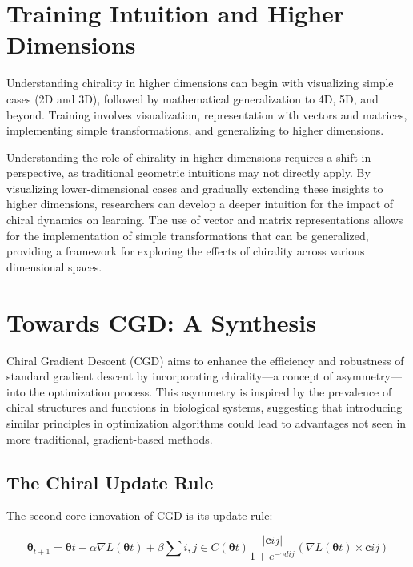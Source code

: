 \documentclass[12pt, a4paper]{article}
\begin{document}
\section{Training Intuition and Higher Dimensions}
Understanding chirality in higher dimensions can begin with visualizing simple cases (2D and 3D), followed by mathematical generalization to 4D, 5D, and beyond. Training involves visualization, representation with vectors and matrices, implementing simple transformations, and generalizing to higher dimensions.

Understanding the role of chirality in higher dimensions requires a shift in perspective, as traditional geometric intuitions may not directly apply. By visualizing lower-dimensional cases and gradually extending these insights to higher dimensions, researchers can develop a deeper intuition for the impact of chiral dynamics on learning. The use of vector and matrix representations allows for the implementation of simple transformations that can be generalized, providing a framework for exploring the effects of chirality across various dimensional spaces.

\section{Towards CGD: A Synthesis}

Chiral Gradient Descent (CGD) aims to enhance the efficiency and robustness of standard gradient descent by incorporating chirality—a concept of asymmetry—into the optimization process. This asymmetry is inspired by the prevalence of chiral structures and functions in biological systems, suggesting that introducing similar principles in optimization algorithms could lead to advantages not seen in more traditional, gradient-based methods.

\subsection{The Chiral Update Rule}

The second core innovation of CGD is its update rule:

\begin{equation} \label{eq:cgd_sigmoid_final}
\boldsymbol{\theta}_{t+1} = \boldsymbol{\theta}t - \alpha \nabla L(\boldsymbol{\theta}t) + \beta \sum{i,j \in C(\boldsymbol{\theta}t)} \frac{| \mathbf{c}{ij} |}{1 + e^{-\gamma d{ij}}} (\nabla L(\boldsymbol{\theta}t) \times \mathbf{c}{ij})
\end{equation}
\end{document}
